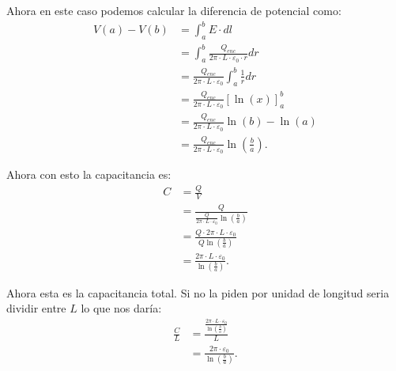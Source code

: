 \documentclass{report}
\begin{document}
Ahora en este caso podemos calcular la diferencia de potencial como:
\begin{align*}
  V\left( a \right) - V\left( b \right) &= \int_{a}^{b} E\cdot dl \\
  &= \int_{a}^{b} \frac{Q_{enc}}{2\pi\cdot L \cdot \varepsilon_0 \cdot r} dr\\
  &= \frac{Q_{enc}}{2\pi\cdot L \cdot \varepsilon_0}\int_{a}^{b} \frac{1}{r} dr\\
  &= \frac{Q_{enc}}{2\pi\cdot L \cdot \varepsilon_0} \left[ \ln(x) \right]_{a}^{b}\\
  &= \frac{Q_{enc}}{2\pi\cdot L \cdot \varepsilon_0} \ln(b) - \ln(a)\\
  &= \frac{Q_{enc}}{2\pi\cdot L \cdot \varepsilon_0} \ln\left( \frac{b}{a} \right)
.\end{align*}

Ahora con esto la capacitancia es:
\begin{align*}
  C &= \frac{Q}{V} \\
  &= \frac{Q}{\frac{Q}{2\pi\cdot L \cdot \varepsilon_0} \ln\left( \frac{b}{a} \right)} \\
  &= \frac{Q \cdot 2\pi\cdot L \cdot \varepsilon_0}{Q \ln\left( \frac{b}{a} \right)} \\
  &= \frac{2\pi\cdot L \cdot \varepsilon_0}{\ln\left( \frac{b}{a} \right)}
.\end{align*}

Ahora esta es la capacitancia total. Si no la piden por unidad de longitud seria dividir entre $L$ lo que nos daría:
 \begin{align*}
  \frac{C}{L} &= \frac{\frac{2\pi\cdot L \cdot \varepsilon_0}{\ln\left( \frac{b}{a} \right)}}{L}  \\
   &= \frac{2\pi \cdot \varepsilon_0}{\ln\left( \frac{b}{a} \right)} 
.\end{align*}
\end{document}
